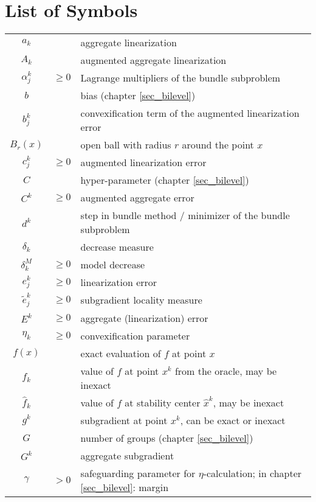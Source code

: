 \section*{List of Symbols}


\begin{longtable}{c@{}c@{} l@{}}
	\(a_k\) && aggregate linearization \\
	\(A_k\) && augmented aggregate linearization \\
		 \(\alpha_j^k\) & \(\geq 0\)& Lagrange multipliers of the bundle subproblem \\
	\(b\) && bias (chapter \ref{sec_bilevel}) \\
	\(b^k_j\) && convexification term of the augmented linearization error \\
	\(B_r(x)\) && open ball with radius \(r\) around the point \(x\) \\
	\(c_j^k\) & \(\geq 0\)& augmented linearization error \\
	\(C\) && hyper-parameter (chapter \ref{sec_bilevel}) \\
	\(C^k\)	&\(\geq 0\)& augmented aggregate error \\
	\(d^k\) && step in bundle method / minimizer of the bundle subproblem \\
	\(\delta_k\) && decrease measure \\
	\(\delta^M_k\) & \(\geq 0\) & model decrease \\
	\(e_j^k\) & \(\geq 0 \)& linearization error \\
	\(\tilde{e}^k_j\) & \(\geq 0\) & subgradient locality measure \\
	\(E^k\) & \(\geq 0\) & aggregate (linearization) error \\
	\(\eta_k\) & \(\geq 0\) & convexification parameter \\
	\(f(x)\) && exact evaluation of \(f\) at point \(x\) \\
	\(f_k\) && value of \(f\) at point \(x^k\) from the oracle, may be inexact \\
	\(\hat{f}_k\) && value of \(f\) at stability center \(\hat{x}^k\), may be inexact \\
	\(g^k\) && subgradient at point \(x^k\), can be exact or inexact \\
	\(G\) && number of groups (chapter \ref{sec_bilevel}) \\
	\(G^k\) && aggregate subgradient \\
	\(\gamma\) & \(>0\) & safeguarding parameter for \(\eta\)-calculation; in chapter \ref{sec_bilevel}: margin \\

\end{longtable}
